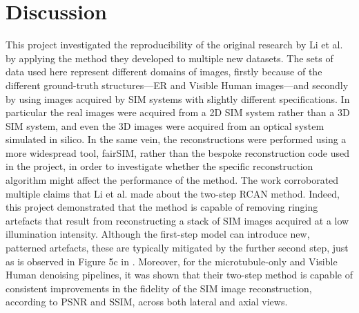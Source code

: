 \documentclass[12pt]{article}
\begin{document}
\section{Discussion}

This project investigated the reproducibility of the original research by Li et al. by applying the method they developed to multiple new datasets.
The sets of data used here represent different domains of images,
firstly because of the different ground-truth structures---ER and Visible Human images---and secondly
by using images acquired by SIM systems with slightly different specifications.
In particular the real images were acquired from a 2D SIM system rather than a 3D SIM system,
and even the 3D images were acquired from an optical system simulated in silico.
In the same vein, the reconstructions were performed using a more widespread tool, fairSIM,
rather than the bespoke reconstruction code used in the project,
in order to investigate whether the specific reconstruction algorithm might affect the performance of the method.
The work corroborated multiple claims that Li et al. made about the two-step RCAN method.
Indeed, this project demonstrated that the method is capable of removing ringing artefacts that result from reconstructing a stack of SIM images acquired at a low illumination intensity.
Although the first-step model can introduce new, patterned artefacts, these are typically mitigated by the further second step,
just as is observed in Figure 5c in \cite{keypaper}.
Moreover, for the microtubule-only and Visible Human denoising pipelines,
it was shown that their two-step method is capable of consistent improvements in the fidelity of the SIM image reconstruction,
according to PSNR and SSIM, across both lateral and axial views.
\end{document}
